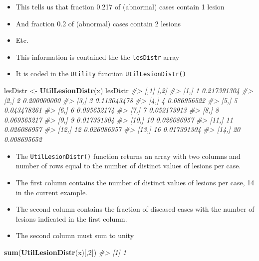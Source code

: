 \documentclass[]{book}
\newenvironment{Shaded}{\begin{snugshade}}{\end{snugshade}}
\newcommand{\CommentTok}[1]{\textcolor[rgb]{0.56,0.35,0.01}{\textit{#1}}}
\newcommand{\DecValTok}[1]{\textcolor[rgb]{0.00,0.00,0.81}{#1}}
\newcommand{\KeywordTok}[1]{\textcolor[rgb]{0.13,0.29,0.53}{\textbf{#1}}}
\newcommand{\NormalTok}[1]{#1}
\newcommand{\StringTok}[1]{\textcolor[rgb]{0.31,0.60,0.02}{#1}}
\providecommand{\tightlist}{%
  \setlength{\itemsep}{0pt}\setlength{\parskip}{0pt}}
\begin{document}
\begin{itemize}
\tightlist
\item
  This tells us that fraction 0.217 of (abnormal) cases contain 1 lesion
\item
  And fraction 0.2 of (abnormal) cases contain 2 lesions
\item
  Etc.
\item
  This information is contained the the \texttt{lesDistr} array
\item
  It is coded in the \texttt{Utility} function \texttt{UtilLesionDistr()}
\end{itemize}

\begin{Shaded}
\begin{Highlighting}[]
\NormalTok{lesDistr <-}\StringTok{ }\KeywordTok{UtilLesionDistr}\NormalTok{(x)}
\NormalTok{lesDistr}
\CommentTok{#>       [,1]        [,2]}
\CommentTok{#>  [1,]    1 0.217391304}
\CommentTok{#>  [2,]    2 0.200000000}
\CommentTok{#>  [3,]    3 0.113043478}
\CommentTok{#>  [4,]    4 0.086956522}
\CommentTok{#>  [5,]    5 0.043478261}
\CommentTok{#>  [6,]    6 0.095652174}
\CommentTok{#>  [7,]    7 0.052173913}
\CommentTok{#>  [8,]    8 0.069565217}
\CommentTok{#>  [9,]    9 0.017391304}
\CommentTok{#> [10,]   10 0.026086957}
\CommentTok{#> [11,]   11 0.026086957}
\CommentTok{#> [12,]   12 0.026086957}
\CommentTok{#> [13,]   16 0.017391304}
\CommentTok{#> [14,]   20 0.008695652}
\end{Highlighting}
\end{Shaded}

\begin{itemize}
\tightlist
\item
  The \texttt{UtilLesionDistr()} function returns an array with two columns and number of rows equal to the number of distinct values of lesions per case.
\item
  The first column contains the number of distinct values of lesions per case, 14 in the current example.
\item
  The second column contains the fraction of diseased cases with the number of lesions indicated in the first column.
\item
  The second column must sum to unity
\end{itemize}

\begin{Shaded}
\begin{Highlighting}[]
\KeywordTok{sum}\NormalTok{(}\KeywordTok{UtilLesionDistr}\NormalTok{(x)[,}\DecValTok{2}\NormalTok{])}
\CommentTok{#> [1] 1}
\end{Highlighting}
\end{Shaded}
\end{document}
